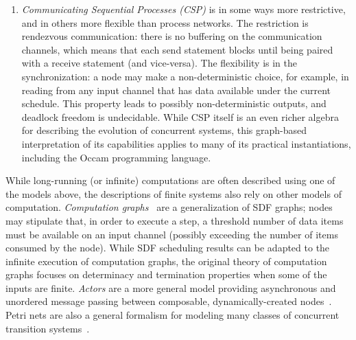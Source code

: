 \begin{enumerate}
\begin{table}[t]
\centering{}
\caption{Key properties of streaming models of
  computation.\protect\label{tab:model-table}}
\end{table}

\item {\it Communicating Sequential Processes (CSP)} is in some ways
  more restrictive, and in others more flexible than process networks.
  The restriction is rendezvous communication: there is no buffering
  on the communication channels, which means that each send statement
  blocks until being paired with a receive statement (and vice-versa).
  The flexibility is in the synchronization: a node may make a
  non-deterministic choice, for example, in reading from any input
  channel that has data available under the current schedule.  This
  property leads to possibly non-deterministic outputs, and deadlock
  freedom is undecidable.  While CSP itself is an even richer algebra
  for describing the evolution of concurrent systems, this graph-based
  interpretation of its capabilities applies to many of its practical
  instantiations, including the Occam programming language.

\end{enumerate}

While long-running (or infinite) computations are often described
using one of the models above, the descriptions of finite systems also
rely on other models of computation.  {\it Computation
  graphs}~\cite{karp_properties_1966} are a generalization of SDF
graphs; nodes may stipulate that, in order to execute a step, a
threshold number of data items must be available on an input channel
(possibly exceeding the number of items consumed by the node).  While
SDF scheduling results can be adapted to the infinite execution of
computation graphs, the original theory of computation graphs focuses
on determinacy and termination properties when some of the inputs are
finite.  {\it Actors} are a more general model providing asynchronous
and unordered message passing between composable, dynamically-created
nodes~\cite{hewitt_universal_1973,greif_semantics_1975,clinger_foundations_1981,agha_actors:model_1985}.
Petri nets are also a general formalism for modeling many classes of
concurrent transition
systems~\cite{petri_communication_1962,murata_petri_1989}.

